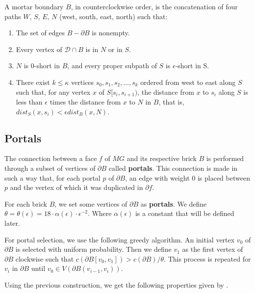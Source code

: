 \begin{flemma}
    A mortar boundary \(B\), in counterclockwise order, is the concatenation of four paths \(W\), \(S\), \(E\), \(N\) (west, south, east, north) such that:
    \begin{enumerate}
        \item The set of edges \(B - \partial B\) is nonempty.
        \item Every vertex of \(\mathcal{D} \cap B\) is in \(N\) or in \(S\).
        \item \(N\) is \(0\)-short in \(B\), and every proper subpath of \(S\) is \(\epsilon\)-short in S.
        \item There exist \(k \leq \kappa\) vertices \(s_0, s_1, s_2, \dots, s_k\) ordered from west to east along \(S\) such that, for any vertex \(x\) of \(S[s_i, s_{i+1})\), the distance from \(x\) to \(s_i\) along \(S\) is less than \(\epsilon\) times the distance from \(x\) to \(N\) in \(B\), that is, \(dist_S(x, s_i) < \epsilon dist_B(x, N)\).
    \end{enumerate}
\end{flemma}

\subsection{Portals}

The connection between a face \(f\) of \(MG\) and its respective brick \(B\) is performed through a subset of vertices of \(\partial B\) called \textbf{portals}. This connection is made in such a way that, for each portal \(p\) of \(\partial B\), an edge with weight 0 is placed between \(p\) and the vertex of which it was duplicated in \(\partial f\).

For each brick \(B\), we set some vertices of \(\partial B\) as \textbf{portals}. We define \(\theta = \theta(\epsilon) = 18 \cdot \alpha(\epsilon) \cdot \epsilon ^ {-2}\). Where \(\alpha(\epsilon)\) is a constant that will be defined later.

For portal selection, we use the following greedy algorithm. An initial vertex \(v_0\) of \(\partial B\) is selected with uniform probability. Then we define \(v_1\) as the first vertex of \(\partial B\) clockwise such that \(c(\partial B[v_0, v_1]) > c(\partial B) / \theta\). This process is repeated for \(v_i\) in \(\partial B\) until \(v_0 \in V(\partial B (v_{i-1}, v_i))\).

Using the previous construction, we get the following properties given by \cite{Borradaile2009b}.

